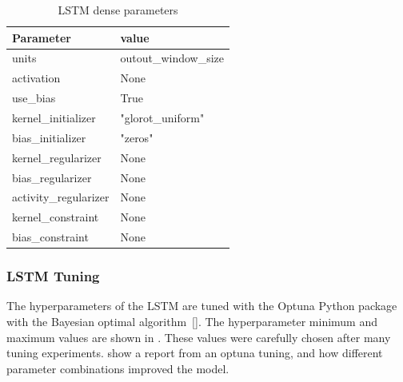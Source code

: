 \begin{table}[h]
  \centering
  \caption{LSTM dense parameters}
  \label{table:LSTM-dense-cell-parameters}
  \begin{tabular}{|l|l|}\hline
    Parameter             & value                \\ \hline
    \hline
    units                 & outout\_window\_size \\
    activation            & None                 \\
    use\_bias             & True                 \\
    kernel\_initializer   & "glorot\_uniform"    \\
    bias\_initializer     & "zeros"              \\
    kernel\_regularizer   & None                 \\
    bias\_regularizer     & None                 \\
    activity\_regularizer & None                 \\
    kernel\_constraint    & None                 \\
    bias\_constraint      & None                 \\
    \hline
  \end{tabular}
\end{table}

\subsubsection{LSTM Tuning}
The hyperparameters of the LSTM are tuned with the Optuna Python package
with the Bayesian optimal algorithm [].
The hyperparameter minimum and maximum values are shown in .
These values were carefully chosen after many tuning experiments.
 show a report from an optuna tuning,
and how different parameter combinations improved the model.


